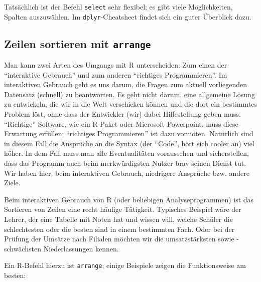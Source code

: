 \documentclass[12pt,]{book}
\begin{document}
Tatsächlich ist der Befehl \texttt{select} sehr flexibel; es gibt viele
Möglichkeiten, Spalten auszuwählen. Im \texttt{dplyr}-Cheatsheet findet
sich ein guter Überblick dazu.

\subsection{\texorpdfstring{Zeilen sortieren mit
\texttt{arrange}}{Zeilen sortieren mit arrange}}\label{zeilen-sortieren-mit-arrange}

Man kann zwei Arten des Umgangs mit R unterscheiden: Zum einen der
``interaktive Gebrauch'' und zum anderen ``richtiges Programmieren''. Im
interaktiven Gebrauch geht es uns darum, die Fragen zum aktuell
vorliegenden Datensatz (schnell) zu beantworten. Es geht nicht darum,
eine allgemeine Lösung zu entwickeln, die wir in die Welt verschicken
können und die dort ein bestimmtes Problem löst, ohne dass der
Entwickler (wir) dabei Hilfestellung geben muss. ``Richtige'' Software,
wie ein R-Paket oder Microsoft Powerpoint, muss diese Erwartung
erfüllen; ``richtiges Programmieren'' ist dazu vonnöten. Natürlich sind
in diesem Fall die Ansprüche an die Syntax (der ``Code'', hört sich
cooler an) viel höher. In dem Fall muss man alle Eventualitäten
voraussehen und sicherstellen, dass das Programm auch beim
merkwürdigsten Nutzer brav seinen Dienst tut. Wir haben hier, beim
interaktiven Gebrauch, niedrigere Ansprüche bzw. andere Ziele.

Beim interaktiven Gebrauch von R (oder beliebigen Analyseprogrammen) ist
das Sortieren von Zeilen eine recht häufige Tätigkeit. Typisches
Beispiel wäre der Lehrer, der eine Tabelle mit Noten hat und wissen
will, welche Schüler die schlechtesten oder die besten sind in einem
bestimmten Fach. Oder bei der Prüfung der Umsätze nach Filialen möchten
wir die umsatzstärksten sowie -schwächsten Niederlassungen kennen.

Ein R-Befehl hierzu ist \texttt{arrange}; einige Beispiele zeigen die
Funktionsweise am besten:
\end{document}
